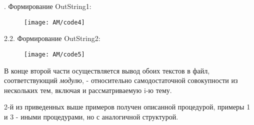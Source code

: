 {. Формирование OutString1:
	\par}

\begin{figure}[H]
	\texttt{[image: AM/code4]}
\end{figure}

%
%
%
%
%
%
%
%

{\centering
	\foreignlanguage{english}{2.2. }Формирование\foreignlanguage{english}{ OutString2:}
	\par}

\begin{figure}[H]
	\texttt{[image: AM/code5]}
\end{figure}

%
%
%
%
%
%
%

В конце второй части осуществляется вывод обоих текстов в файл, соответствующий \textit{модулю}, - относительно
самодостаточной совокупности из нескольких тем, включая и рассматриваемую \foreignlanguage{english}{i}{}-ю тему.

2-й из приведенных выше примеров получен описанной процедурой, примеры 1 и 3 - иными процедурами, но с аналогичной
структурой.


